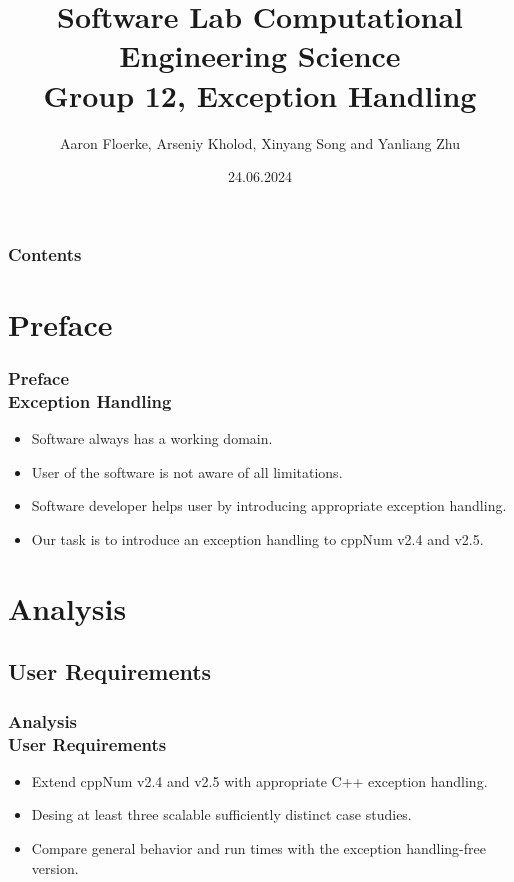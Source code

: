 \documentclass[ucs,10pt]{beamer}
\begin{document}
\title[{\tt info@stce.rwth-aachen.de}]{\textcolor{rwth-blue}{Software Lab Computational Engineering Science} \vspace{.2cm} \\ {\small Group 12, Exception Handling}}
\author[Group 12)]{Aaron Floerke, Arseniy Kholod, Xinyang Song and Yanliang Zhu} 
\date[]{24.06.2024}

\begin{frame}[plain]
\titlepage
\end{frame}

\begin{frame}
	\frametitle{Contents}
\tableofcontents
\end{frame}

\section{Preface}

\begin{frame}
\frametitle{Preface \\
	\small \color{rwth-blue} Exception Handling}

	\begin{itemize}
		\item Software always has a working domain.
		\item User of the software is not aware of all limitations.
		\item Software developer helps user by introducing appropriate exception handling.
		\item Our task is to introduce an exception handling to cppNum v2.4 and v2.5.
	\end{itemize}
\end{frame}

\section{Analysis}

\subsection{User Requirements}

\begin{frame}
\frametitle{Analysis \\
	\small \color{rwth-blue} User Requirements}
	\begin{itemize}
		\item Extend cppNum v2.4 and v2.5 with appropriate C++ exception handling.
		\item Desing at least three scalable sufficiently distinct case studies.
		\item Compare general behavior and run times with the exception handling-free version.
	\end{itemize}
\end{frame}
\end{document}
